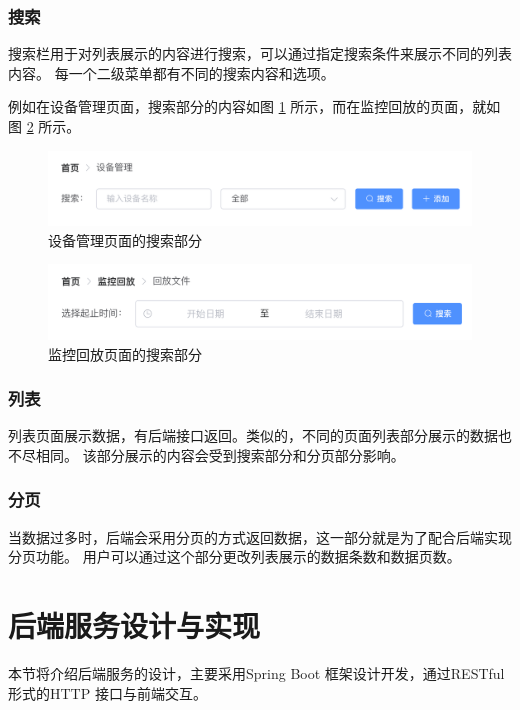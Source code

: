 \subsubsection{搜索}
搜索栏用于对列表展示的内容进行搜索，可以通过指定搜索条件来展示不同的列表内容。
每一个二级菜单都有不同的搜索内容和选项。

例如在设备管理页面，搜索部分的内容如图 \ref{Fig:search_device} 所示，而在监控回放的页面，就如图 
\ref{Fig:search_replay} 所示。

\begin{figure}[ht]
    \centering
    \includegraphics[width=0.9\linewidth]{./Figure/IMG_search_device.png}
    \caption{设备管理页面的搜索部分}\label{Fig:search_device}
\end{figure}

\begin{figure}[ht]
    \centering
    \includegraphics[width=0.9\linewidth]{./Figure/IMG_search_replay.png}
    \caption{监控回放页面的搜索部分}\label{Fig:search_replay}
\end{figure}

\subsubsection{列表}
列表页面展示数据，有后端接口返回。类似的，不同的页面列表部分展示的数据也不尽相同。
该部分展示的内容会受到搜索部分和分页部分影响。

\subsubsection{分页}
当数据过多时，后端会采用分页的方式返回数据，这一部分就是为了配合后端实现分页功能。
用户可以通过这个部分更改列表展示的数据条数和数据页数。

\section{后端服务设计与实现}
本节将介绍后端服务的设计，主要采用Spring Boot 框架设计开发，通过RESTful形式的HTTP 接口与前端交互。

